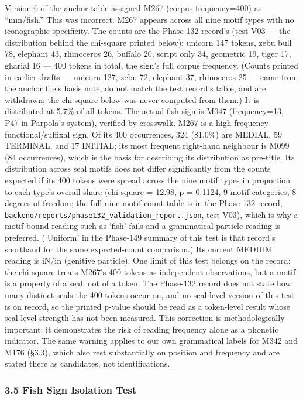 \documentclass[
]{article}
\begin{document}
Version 6 of the anchor table assigned M267 (corpus frequency=400) as
``mīn/fish.'' This was incorrect. M267 appears across all nine motif types with no iconographic specificity. The counts are the Phase-132 record's (test V03 --- the distribution behind the chi-square printed below): unicorn 147 tokens, zebu bull 78, elephant 43, rhinoceros 26, buffalo 20, script only 34, geometric 19, tiger 17, gharial 16 --- 400 tokens in total, the sign's full corpus frequency. (Counts printed in earlier drafts --- unicorn 127, zebu 72, elephant 37, rhinoceros 25 --- came from the anchor file's basis note, do not match the test record's table, and are withdrawn; the chi-square below was never computed from them.) It is distributed at
5.7\% of all tokens. The actual fish sign is M047 (frequency=13, P47 in
Parpola's system), verified by crosswalk. M267 is a high-frequency functional/suffixal sign. Of its 400 occurrences, 324 (81.0\%) are MEDIAL, 59 TERMINAL, and 17 INITIAL; its most frequent right-hand neighbour is M099 (84 occurrences), which is the basis for describing its distribution as pre-title. Its distribution across seal motifs does not differ significantly from the counts expected if its 400 tokens were spread across the nine motif types in proportion to each type's overall share (chi-square = 12.98, p = 0.1124, 9 motif categories, 8 degrees of freedom; the full nine-motif count table is in the Phase-132 record, \texttt{backend/reports/phase132\_validation\_report.json}, test V03), which is why a motif-bound reading such as `fish' fails and a grammatical-particle reading is preferred. (`Uniform' in the Phase-149 summary of this test is that record's shorthand for the same expected-count comparison.) Its current MEDIUM reading is iN/in (genitive particle). One limit of this test belongs on the record: the chi-square treats M267's 400 tokens as independent observations, but a motif is a property of a seal, not of a token. The Phase-132 record does not state how many distinct seals the 400 tokens occur on, and no seal-level version of this test is on record, so the printed p-value should be read as a token-level result whose seal-level strength has not been measured. This correction is methodologically important: it demonstrates the risk of reading frequency alone as a phonetic indicator. The same warning applies to our own grammatical labels for M342 and M176 (§3.3), which also rest substantially on position and frequency and are stated there as candidates, not identifications.

\subsubsection{3.5 Fish Sign Isolation
 Test}\label{fish-sign-isolation-test}
\end{document}
